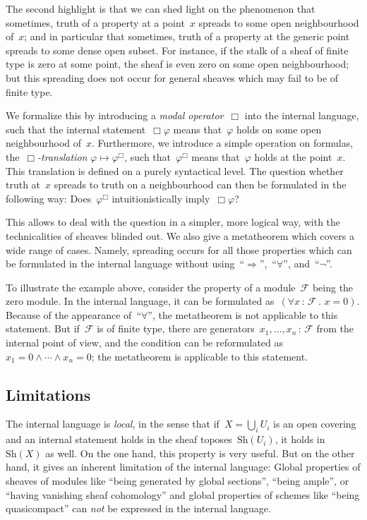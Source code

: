 \documentclass[10pt]{amsart}
\theoremstyle{definition}
\theoremstyle{plain}
\theoremstyle{remark}
\newcommand{\F}{\mathcal{F}}
\newcommand{\Sh}{\mathrm{Sh}}
\newcommand{\?}{\,{:}\,}
\renewcommand{\_}{\mathpunct{.}\,}
\begin{document}
The second highlight is that we can shed light on the phenomenon that
sometimes, truth of a property at a point~$x$ spreads to some open
neighbourhood of~$x$; and in particular that sometimes, truth of a property at
the generic point spreads to some dense open subset. For instance, if the stalk
of a sheaf of finite type is zero at some point, the sheaf is even zero on some
open neighbourhood; but this spreading does not occur for general sheaves which
may fail to be of finite type.

We formalize this by introducing a \emph{modal operator}~$\Box$ into the
internal language, such that the internal statement~$\Box\varphi$ means
that~$\varphi$ holds on some open neighbourhood of~$x$. Furthermore, we
introduce a simple operation on formulas, the~\emph{$\Box$-translation}
$\varphi \mapsto \varphi^\Box$, such that~$\varphi^\Box$ means that~$\varphi$
holds at the point~$x$. This translation is defined on a purely syntactical
level. The question whether truth at~$x$ spreads to truth on a
neighbourhood can then be formulated in the following way: Does~$\varphi^\Box$
intuitionistically imply~$\Box\varphi$?

This allows to deal with the question in a simpler, more logical way, with the
technicalities of sheaves blinded out. We also give a metatheorem which
covers a wide range of cases. Namely, spreading occurs for all those properties
which can be formulated in the internal language without
using~``$\Rightarrow$'',~``$\forall$'', and~``$\neg$''.

To illustrate the example above, consider the property of a module~$\F$ being
the zero module. In the internal language, it can be formulated as~$(\forall x\?\F\_ x = 0)$.
Because of the appearance of~``$\forall$'', the metatheorem is not
applicable to this statement. But if~$\F$ is of finite type, there are
generators~$x_1,\ldots,x_n\?\F$ from the internal point of view, and the
condition can be reformulated as~$x_1 = 0 \wedge \cdots \wedge x_n = 0$; the
metatheorem is applicable to this statement.


\subsection*{Limitations} The internal language is \emph{local}, in the sense
that if~$X = \bigcup_i U_i$ is an open covering and an internal statement
holds in the sheaf toposes~$\Sh(U_i)$, it holds in~$\Sh(X)$ as well. On the one
hand, this property is very useful. But on the other hand, it gives an inherent
limitation of the internal language:
Global properties of sheaves of modules like ``being generated by global
sections'', ``being ample'', or ``having vanishing sheaf cohomology'' and global properties of schemes like ``being
quasicompact'' can \emph{not} be
expressed in the internal language.
\end{document}
